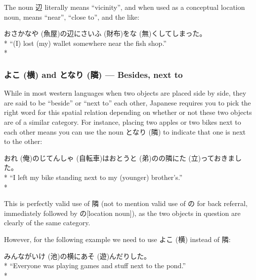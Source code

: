 \documentclass[11pt, b5paper, twoside, openright, onecolumn]{book}
\makeatletter
\newcommand*{\rubystack}[2]{{\relscale{0.5}%
  \begin{tabular}[b]{@{}c@{}}%
    {#1}\\%
   {\textscale{2}{#2}}%
  \end{tabular}}%
}
\DeclareRobustCommand*{\ruby}[2]{%
  \mbox{%
    \setlength{\parskip}{0ex}%
    \BeginAccSupp{method=pdfstringdef,ActualText={#1}}%
      \rubystack{\phantom{#2}}{#1}%
      \llap{%
        \rubystack{#2}{\phantom{#1}}%
      }%
    \EndAccSupp{}%
  }%
}
\renewcommand*{\ruby}[2]{#2 (#1)}%
\newenvironment{exampleblock}{
\setlength{\parindent}{0.6in}
\begin{minipage}[t]{\dimexpr\textwidth-\parindent}}
{\end{minipage}}
\makeatother
\begin{document}
The noun 辺 literally means “vicinity”‚ and when used as a conceptual location noun‚ means “near”‚ “close to”‚ and the like:

\vspace{0.4cm}
\begin{exampleblock}
お\ruby{魚屋}{さかなや}の辺に\ruby{財布}{さいふ}を\ruby{無}{な}くしてしまった。 \\* 
“(I) lost (my) wallet somewhere near the fish shop.” \\* 
\end{exampleblock}
\subsubsection{\ruby{横}{よこ} and \ruby{隣}{となり} — Besides‚ next to}


While in most western languages when two objects are placed side by side‚ they are said to be “beside” or “next to” each other‚ Japanese requires you to pick the right word for this spatial relation depending on whether or not these two objects are of a similar category. For instance‚ placing two apples or two bikes next to each other means you can use the noun \ruby{隣}{となり} to indicate that one is next to the other:

\vspace{0.4cm}
\begin{exampleblock}
\ruby{俺}{おれ}の\ruby{自転車}{じてんしゃ}は\ruby{弟}{おとうと}のの隣に\ruby{立}{た}っておきました。 \\* 
“I left my bike standing next to my (younger) brother’s.” \\* 
\end{exampleblock}
\vspace{0.2cm}

This is perfectly valid use of 隣 (not to mention valid use of の for back referral‚ immediately followed by の[location noun])‚ as the two objects in question are clearly of the same category.

However‚ for the following example we need to use \ruby{横}{よこ} instead of 隣:

\vspace{0.4cm}
\begin{exampleblock}
みんなが\ruby{池}{いけ}の横に\ruby{遊}{あそ}んだりした。 \\* 
“Everyone was playing games and stuff next to the pond.” \\* 
\end{exampleblock}
\vspace{0.2cm}
\end{document}
